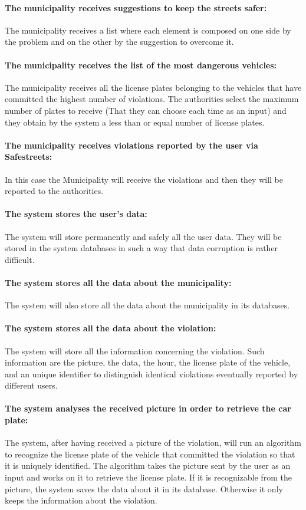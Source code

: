 \documentclass[titlepage]{article}
\begin{document}
\paragraph{The municipality receives suggestions to keep the streets safer: }
The municipality receives a list where each element is composed on one side by the problem and on the other by the suggestion to overcome it.
\paragraph{The municipality receives the list of the most 			dangerous vehicles: }
The municipality receives all the license plates belonging to the vehicles that have committed the highest number of violations. The authorities select the maximum number of plates to receive (That they can choose each time as an input) and they obtain by the system a less than or equal number of license plates.
\paragraph{The municipality receives violations reported by the user via Safestreets:} In this case the Municipality will receive the violations and then they will be reported to the authorities.
\paragraph{The system stores the user's data:}
The system will store permanently and safely all the user data. They will be stored in the system databases in such a way that data corruption is rather difficult.
\paragraph{The system stores all the data about the 					municipality:}
The system will also store all the data about the municipality in its databases.
\paragraph{The system stores all the data about the violation: }
The system will store all the information concerning the violation. Such information are the picture, the data, the hour, the license plate of the vehicle, and an unique identifier to distinguish identical violations eventually reported by different users.
\paragraph{The system analyses the received picture in order to 	retrieve the car plate: }
The system, after having received a picture of the violation, will run an algorithm to recognize the license plate of the vehicle that committed the violation so that it is uniquely identified. The algorithm takes the picture sent by the user as an input and works on it to retrieve the license plate. If it is recognizable from the picture, the system saves the data about it in its database. Otherwise it only keeps the information about the violation.
\end{document}
